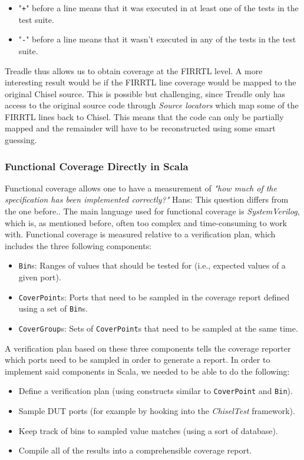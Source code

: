 \documentclass[runningheads]{llncs}
\newcommand{\hjd}[1]{{\color{pink} Hans: #1}}
\begin{document}
\begin{itemize}
  \item "\texttt{+}" before a line means that it was executed in at least one of the tests in the test suite.
  \item "\texttt{-}" before a line means that it wasn't executed in any of the tests in the test suite.
\end{itemize}

Treadle thus allows us to obtain coverage at the FIRRTL level. A more interesting result would be if the FIRRTL line coverage would be mapped to the original Chisel source. This is possible but challenging, since Treadle only has access to the original source code through \textit{Source locators} which map some of the FIRRTL lines back to Chisel. This means that the code can only be partially mapped and the remainder will have to be reconstructed using some smart guessing.

\subsubsection{Functional Coverage Directly in Scala}
Functional coverage allows one to have a measurement of \textit{"how much of the specification has been implemented correctly?"} \hjd{This question differs from the one before.}. The main language used for functional coverage is \textit{SystemVerilog}, which is, as mentioned before, often too complex and time-consuming to work with. Functional coverage is measured relative to a verification plan, which includes the three following components:

\begin{itemize}
  \item \texttt{Bin}s: Ranges of values that should be tested for (i.e., expected values of a given port).
  \item \texttt{CoverPoint}s: Ports that need to be sampled in the coverage report defined using a set of \texttt{Bin}s.
  \item \texttt{CoverGroup}s: Sets of \texttt{CoverPoint}s that need to be sampled at the same time.
\end{itemize}

A verification plan based on these three components tells the coverage reporter which ports need to be sampled in order to generate a report. In order to implement said components in Scala, we needed to be able to do the following:

\begin{itemize}
  \item Define a verification plan (using constructs similar to \texttt{CoverPoint} and \texttt{Bin}).
  \item Sample DUT ports (for example by hooking into the \textit{ChiselTest} framework).
  \item Keep track of bins to sampled value matches (using a sort of database).
  \item Compile all of the results into a comprehensible coverage report.
\end{itemize}
\end{document}
